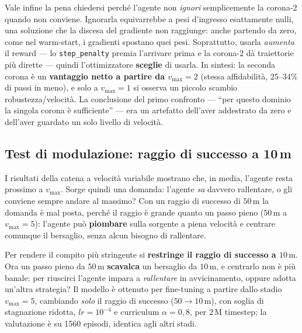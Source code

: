 Vale infine la pena chiedersi perch\'e l'agente non \emph{ignori} semplicemente la
corona-2 quando non conviene. Ignorarla equivarrebbe a pesi d'ingresso esattamente nulli,
una soluzione che la discesa del gradiente non raggiunge: anche partendo da zero, come nel
warm-start, i gradienti spostano quei pesi. Soprattutto, usarla \emph{aumenta} il reward
--- lo \texttt{step\_penalty} premia l'arrivare prima e la corona-2 d\`a traiettorie pi\`u
dirette --- quindi l'ottimizzatore \textbf{sceglie} di usarla. In sintesi: la seconda
corona \`e un \textbf{vantaggio netto a partire da $v_{\max}{=}2$} (stessa affidabilit\`a,
$25$--$34\%$ di passi in meno), e solo a $v_{\max}{=}1$ si osserva un piccolo scambio
robustezza/velocit\`a. La conclusione del primo confronto --- ``per questo dominio la
singola corona \`e sufficiente'' --- era un artefatto dell'aver addestrato da zero e
dell'aver guardato un solo livello di velocit\`a.

\subsection{Test di modulazione: raggio di successo a 10\,m}
\label{sec:rl_r10}

I risultati della catena a velocit\`a variabile mostrano che, in media, l'agente resta
prossimo a $v_{\max}$. Sorge quindi una domanda: l'agente \emph{sa} davvero rallentare, o
gli conviene sempre andare al massimo? Con un raggio di successo di $50\,\text{m}$ la
domanda \`e mal posta, perch\'e il raggio \`e grande quanto un passo pieno
($50\,\text{m}$ a $v_{\max}{=}5$): l'agente pu\`o \textbf{piombare} sulla sorgente a piena
velocit\`a e centrare comunque il bersaglio, senza alcun bisogno di rallentare.

Per rendere il compito pi\`u stringente si \textbf{restringe il raggio di successo a
$10\,\text{m}$}. Ora un passo pieno da $50\,\text{m}$ \textbf{scavalca} un bersaglio da
$10\,\text{m}$, e centrarlo non \`e pi\`u banale: per riuscirci l'agente impara a
\emph{rallentare} in avvicinamento, oppure adotta un'altra strategia? Il modello \`e
ottenuto per fine-tuning a partire dallo stadio $v_{\max}{=}5$, cambiando \emph{solo} il
raggio di successo ($50 \to 10\,\text{m}$), con soglia di stagnazione ridotta,
$lr = 10^{-4}$ e curriculum $\alpha = 0{,}8$, per $2$\,M timestep; la valutazione \`e su
1560 episodi, identica agli altri stadi.

